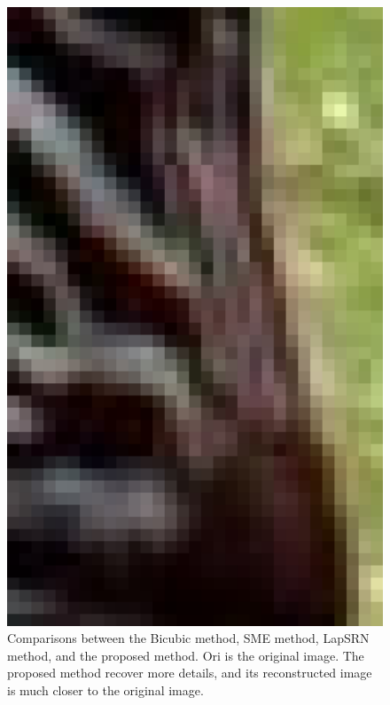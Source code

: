 \documentclass[review,numbers,sort&compress]{elsarticle}  %
\begin{document}
\begin{figure}[t]
{\begin{minipage}[b]{0.12\textwidth}
                \includegraphics[width=1\textwidth]{compareImage/ORI_zebra_mag_2.png}
            \end{minipage}
        }
    \caption{Comparisons between the Bicubic method, SME method, LapSRN method, and the proposed method. Ori is the original image. The proposed method recover more details, and its reconstructed image is much closer to the original image.}
    \label{fig:color_zebra}
\end{figure}
\end{document}
